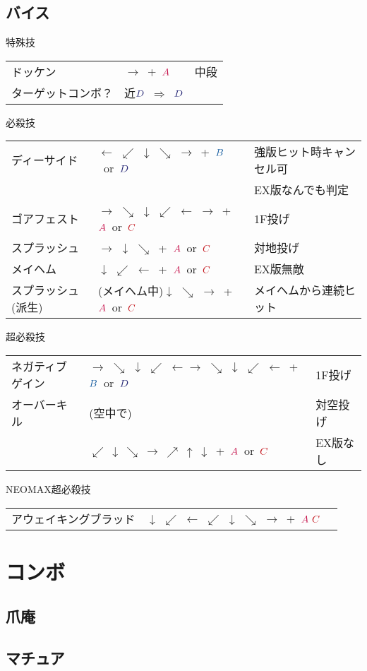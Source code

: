 \documentclass[a4j,11pt]{jarticle}
\def\A{\textcolor{Acolor}{A}}
\def\C{\textcolor{Ccolor}{C}}
\def\B{\textcolor{Bcolor}{B}}
\def\D{\textcolor{Dcolor}{D}}
\def\hado{$\downarrow$ $\searrow$ $\rightarrow$}%
\def\tatsu{$\downarrow$ $\swarrow$ $\leftarrow$}%
\def\syoryu{$\rightarrow$ $\downarrow$ $\searrow$}%
\def\yoga{$\leftarrow$ $\swarrow$ $\downarrow$ $\searrow$ $\rightarrow$}%
\def\gyakuyoga{$\rightarrow$ $\searrow$ $\downarrow$ $\swarrow$ $\leftarrow$}%
\def\tenti{$\rightarrow$ $\searrow$ $\downarrow$ $\swarrow$ $\leftarrow$ $\rightarrow$}%
\def\orochi{$\downarrow$ $\swarrow$ $\leftarrow$ $\swarrow$ $\downarrow$ $\searrow$ $\rightarrow$}%
\def\Cancel{$\Longrightarrow$}
\begin{document}
\subsection{バイス}
\begin{itembox}[l]{特殊技}
\begin{tabular}{lll}
ドッケン&$\rightarrow$\ +\ $\A$&中段\\%
ターゲットコンボ？&近$\D$\ \Cancel\ $\D$&%
\end{tabular}
\end{itembox}
\begin{itembox}[l]{必殺技}
\begin{tabular}{lll}
ディーサイド&\yoga\ +\ $\B$\ or\ $\D$&強版ヒット時キャンセル可\\
&&EX版なんでも判定\\%
ゴアフェスト&\tenti\ +\ $\A$\ or\ $\C$&1F投げ\\%
スプラッシュ&\syoryu\ +\ $\A$\ or\ $\C$&対地投げ\\%
メイヘム&\tatsu\ +\ $\A$\ or\ $\C$&EX版無敵\\%
スプラッシュ(派生)&(メイヘム中)\hado\ +\ $\A$\ or\ $\C$&メイヘムから連続ヒット%
\end{tabular}
\end{itembox}
\begin{itembox}[l]{超必殺技}
\begin{tabular}{lll}
ネガティブゲイン&\gyakuyoga\gyakuyoga\ +\ $\B$\ or\ $\D$&1F投げ\\%
オーバーキル&(空中で)&対空投げ \\%
&$\swarrow\ \downarrow\ \searrow\ \rightarrow\ \nearrow\ \uparrow\
\downarrow$\ +\ $\A$\ or\ $\C$&EX版なし
\end{tabular}
\end{itembox}
\begin{itembox}[l]{NEOMAX超必殺技}
\begin{tabular}{lll}
アウェイキングブラッド&\orochi\ +\ $\A\ \C$&%
\end{tabular}
\end{itembox}
\newpage
\section{コンボ}
\subsection{爪庵}
\subsection{マチュア}
\end{document}
